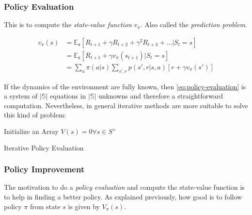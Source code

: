 \documentclass[paper=a4,fontsize=11pt]{scrartcl} %
\numberwithin{equation}{section} %
\numberwithin{figure}{section} %
\numberwithin{table}{section} %
\begin{document}
\subsubsection{Policy Evaluation}

This is to compute the \textit{state-value function} $v_\pi$. 
Also called the \textit{prediction problem}.

\begin{equation}
    \begin{aligned}
        v_\pi(s) &= \mathbb{E_\pi} \left[ 
            R_{t+1} + \gamma R_{t+2} + \gamma^2 R_{t+3} + ... | S_t = s
        \right] \\ 
        &= \mathbb{E_\pi} \left[ 
            R_{t+1} + \gamma v_\pi(s_{t+1}) | S_t = s
        \right] \\
        &= \sum_a \pi(a|s) \sum_{s',r} p(s',r|s, a) \left[ r + \gamma v_\pi(s') \right]
    \end{aligned}
    \label{eq:policy-evaluation}
\end{equation}

If the dynamics of the environment are fully known, then \ref{eq:policy-evaluation}
is a system of $|\mathbb{S}|$ equations in $|\mathbb{S}|$ unknowns and therefore
a straightforward computation. Nevertheless, in general iterative methods are more 
suitable to solve this kind of problem: \\

\begin{algorithm}[H]
    \SetAlgoLined
     Initialize an Array $V(s)=0 \forall s \in S^+ $ \;
     \caption{Iterative Policy Evaluation}\end{algorithm}


\subsubsection{Policy Improvement}
The motivation to do a \textit{policy evaluation} and compute the 
state-value function is to help in finding a better policy.
As explained previously, how good is to follow policy $\pi$ from state
$s$ is given by $V_\pi(s)$.
\end{document}

